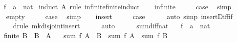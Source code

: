 \begin{isabellebody}
\ \ \ f\ {\isacharcolon}{\kern0pt}{\isacharcolon}{\kern0pt}\ {\isachardoublequoteopen}{\isacharprime}{\kern0pt}a\ {\isasymRightarrow}\ nat{\isachardoublequoteclose}\isanewline
%
\isadelimproof
%
\endisadelimproof
%
\isatagproof
{}\isamarkupfalse%
\ {\isacharparenleft}{\kern0pt}induct\ A\ rule{\isacharcolon}{\kern0pt}\ infinite{\isacharunderscore}{\kern0pt}finite{\isacharunderscore}{\kern0pt}induct{\isacharparenright}{\kern0pt}\isanewline
\ \ \isamarkupfalse%
\ infinite\isanewline
\ \ \isamarkupfalse%
\ \isamarkupfalse%
\ {\isacharquery}{\kern0pt}case\ \isamarkupfalse%
\ simp\isanewline
{}\isamarkupfalse%
\isanewline
\ \ \isamarkupfalse%
\ empty\isanewline
\ \ \isamarkupfalse%
\ \isamarkupfalse%
\ {\isacharquery}{\kern0pt}case\ \isamarkupfalse%
\ simp\isanewline
{}\isamarkupfalse%
\isanewline
\ \ \isamarkupfalse%
\ insert\isanewline
\ \ \isamarkupfalse%
\ \isamarkupfalse%
\ {\isacharquery}{\kern0pt}case\isanewline
\ \ \ \ \isamarkupfalse%
\ {\isacharparenleft}{\kern0pt}auto\ simp{\isacharcolon}{\kern0pt}\ insert{\isacharunderscore}{\kern0pt}Diff{\isacharunderscore}{\kern0pt}if{\isacharparenright}{\kern0pt}\isanewline
\ \ \ \ \isamarkupfalse%
\ {\isacharparenleft}{\kern0pt}drule\ mk{\isacharunderscore}{\kern0pt}disjoint{\isacharunderscore}{\kern0pt}insert{\isacharparenright}{\kern0pt}\isanewline
\ \ \ \ \isamarkupfalse%
\ auto\isanewline
\ \ \ \ \isamarkupfalse%
\isanewline
{}\isamarkupfalse%
%
\endisatagproof
{\isafoldproof}%
%
\isadelimproof
\isanewline
%
\endisadelimproof
\isanewline
{}\isamarkupfalse%
\ sum{\isacharunderscore}{\kern0pt}diff{\isacharunderscore}{\kern0pt}nat{\isacharcolon}{\kern0pt}\isanewline
\ \ \ f\ {\isacharcolon}{\kern0pt}{\isacharcolon}{\kern0pt}\ {\isachardoublequoteopen}{\isacharprime}{\kern0pt}a\ {\isasymRightarrow}\ nat{\isachardoublequoteclose}\isanewline
\ \ \ {\isachardoublequoteopen}finite\ B{\isachardoublequoteclose}\ \ {\isachardoublequoteopen}B\ {\isasymsubseteq}\ A{\isachardoublequoteclose}\isanewline
\ \ \ {\isachardoublequoteopen}sum\ f\ {\isacharparenleft}{\kern0pt}A\ {\isacharminus}{\kern0pt}\ B{\isacharparenright}{\kern0pt}\ {\isacharequal}{\kern0pt}\ sum\ f\ A\ {\isacharminus}{\kern0pt}\ sum\ f\ B{\isachardoublequoteclose}\isanewline

\end{isabellebody}
